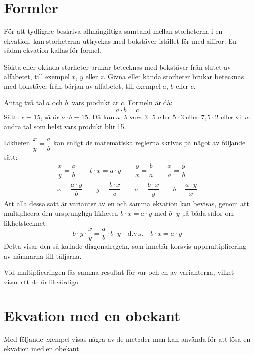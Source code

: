\section{Formler}

För att tydligare beskriva allmängiltiga samband mellan storheterna i en
ekvation, kan storheterna uttryckas med bokstäver istället för med siffror.
En sådan ekvation kallas för formel.

Sökta eller okända storheter brukar betecknas med bokstäver från slutet av
alfabetet, till exempel $x$, $y$ eller $z$.
Givna eller kända storheter brukar betecknas med bokstäver från början av
alfabetet, till exempel $a$, $b$ eller $c$.

Antag två tal $a$ och $b$, vars produkt är $c$.
Formeln är då:
\[a \cdot b = c\]
Sätts \(c = 15\), så är \(a \cdot b = 15\).
Då kan \(a \cdot b\) vara \(3 \cdot 5\) eller \(5 \cdot 3\) eller
\(7,5 \cdot 2\) eller vilka andra tal som helst vars produkt blir 15.

Likheten \(\dfrac{x}{y} = \dfrac{a}{b}\) kan enligt de matematiska reglerna
skrivas på något av följande sätt:
\begin{gather*}
  \dfrac{x}{y} = \dfrac{a}{b} \qquad
b \cdot x = a \cdot y \qquad
\dfrac{y}{x} = \dfrac{b}{a} \qquad
\dfrac{x}{a} = \dfrac{y}{b} \\
x = \dfrac{a \cdot y}{b} \qquad
y = \dfrac{b \cdot x}{a} \qquad
a = \dfrac{b \cdot x}{y} \qquad
b = \dfrac{a \cdot y}{x}
\end{gather*}
Att alla dessa sätt är varianter av en och samma ekvation kan bevisas, genom att
multiplicera den ursprungliga likheten \(b \cdot x = a \cdot y\) med \(b \cdot
y\) på båda sidor om likhetstecknet,
\[
b \cdot y \cdot \frac{x}{y} = \frac{a}{b} \cdot b \cdot y \quad \text{d.v.s.}
\quad b \cdot x = a \cdot y
\]
Detta visar den så kallade diagonalregeln, som innebär korsvis uppmultiplicering
av nämnarna till täljarna.

Vid multipliceringen fås samma resultat för var och en av varianterna, vilket
visar att de är likvärdiga.

\section{Ekvation med en obekant}

Med följande exempel visas några av de metoder man kan använda för att lösa en
ekvation med en obekant.

